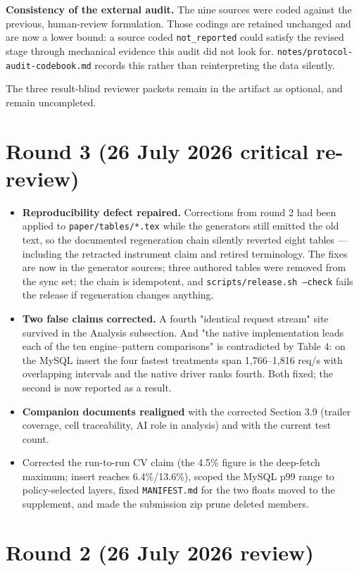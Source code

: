\documentclass[11pt,a4paper]{article}
\begin{document}
\textbf{Consistency of the external audit.} The nine sources were coded against the previous, human-review formulation. Those codings are retained unchanged and are now a lower bound: a source coded \texttt{not\_reported} could satisfy the revised stage through mechanical evidence this audit did not look for. \texttt{notes/protocol-audit-codebook.md} records this rather than reinterpreting the data silently.

The three result-blind reviewer packets remain in the artifact as optional, and remain uncompleted.

\section*{Round 3 (26 July 2026 critical re-review)}

\begin{itemize}
  \item \textbf{Reproducibility defect repaired.} Corrections from round 2 had been applied to \texttt{paper/tables/*.tex} while the generators still emitted the old text, so the documented regeneration chain silently reverted eight tables --- including the retracted instrument claim and retired terminology. The fixes are now in the generator sources; three authored tables were removed from the sync set; the chain is idempotent, and \texttt{scripts/release.sh --check} fails the release if regeneration changes anything.
  \item \textbf{Two false claims corrected.} A fourth "identical request stream" site survived in the Analysis subsection. And "the native implementation leads each of the ten engine--pattern comparisons" is contradicted by Table 4: on the MySQL insert the four fastest treatments span 1,766--1,816 req/s with overlapping intervals and the native driver ranks fourth. Both fixed; the second is now reported as a result.
  \item \textbf{Companion documents realigned} with the corrected Section 3.9 (trailer coverage, cell traceability, AI role in analysis) and with the current test count.
  \item Corrected the run-to-run CV claim (the 4.5\% figure is the deep-fetch maximum; insert reaches 6.4\%/13.6\%), scoped the MySQL p99 range to policy-selected layers, fixed \texttt{MANIFEST.md} for the two floats moved to the supplement, and made the submission zip prune deleted members.
\end{itemize}

\section*{Round 2 (26 July 2026 review)}
\end{document}
